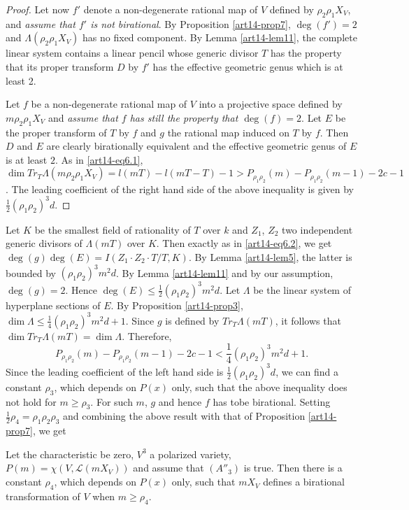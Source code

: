 \begin{proof}
Let now $f'$ denote a non-degenerate rational map of $V$ defined by $\rho_{2}\rho_{1}X_{V}$, and {\em assume that $f'$ is not birational}. By Proposition \ref{art14-prop7}, $\deg(f')=2$ and $\Lambda(\rho_{2}\rho_{1}X_{V})$ has no fixed component. By Lemma \ref{art14-lem11}, the complete linear system contains a linear pencil whose generic divisor $T$ has the property that its proper transform $D$ by $f'$ has the effective geometric genus which is at least 2.

Let $f$ be a non-degenerate rational map of $V$ into a projective space defined by $m\rho_{2}\rho_{1}X_{V}$ and {\em assume that $f$ has still the property that $\deg(f)=2$}. Let $E$ be the proper transform of $T$ by $f$ and $g$ the rational map induced on $T$ by $f$. Then $D$ and $E$ are clearly birationally equivalent and the effective geometric genus of $E$ is at least $2$. As in \eqref{art14-eq6.1}, $\dim Tr_{T}\Lambda(m\rho_{2}\rho_{1}X_{V})=l(mT)-l(mT-T)-1>P_{\rho_{1}\rho_{2}}(m)-P_{\rho_{1}\rho_{2}}(m-1)-2c-1$. The leading coefficient of the right hand side of the above inequality is given by $\frac{1}{2}(\rho_{1}\rho_{2})^{3}d$.
\end{proof}

Let $K$ be the smallest field of rationality of $T$ over $k$ and $Z_{1}$, $Z_{2}$ two independent generic divisors of $\Lambda(mT)$ over $K$. Then exactly as in \eqref{art14-eq6.2}, we get $\deg(g)\deg(E)=I(Z_{1}\cdot Z_{2}\cdot T/T,K)$. By Lemma \ref{art14-lem5}, the latter is bounded by $(\rho_{1}\rho_{2})^{3}m^{2}d$. By Lemma \ref{art14-lem11} and by our assumption, $\deg(g)=2$. Hence $\deg(E)\leq \frac{1}{2}(\rho_{1}\rho_{2})^{3}m^{2}d$. Let $\Lambda$ be the linear system of hyperplane sections of $E$. By Proposition \ref{art14-prop3}, $\dim \Lambda\leq \frac{1}{4}(\rho_{1}\rho_{2})^{3}m^{2}d+1$. Since $g$ is defined by $Tr_{T}\Lambda (mT)$, it follows that $\dim Tr_{T}\Lambda(mT)=\dim \Lambda$. Therefore,
$$
P_{\rho_{1}\rho_{2}}(m)-P_{\rho_{1}\rho_{2}}(m-1)-2c-1<\frac{1}{4}(\rho_{1}\rho_{2})^{3}m^{2}d+1.
$$
Since the leading coefficient of the left hand side is $\frac{1}{2}(\rho_{1}\rho_{2})^{3}d$, we can find a constant $\rho_{3}$, which depends on $P(x)$ only, such that the above inequality does not hold for $m\geq \rho_{3}$. For such $m$, $g$ and hence $f$ has to\pageoriginale be birational. Setting $\frac{1}{2}\rho_{4}=\rho_{1}\rho_{2}\rho_{3}$ and combining the above result with that of Proposition \ref{art14-prop7}, we get

\begin{theorem}\label{art14-thm1}
Let the characteristic be zero, $V^{3}$ a polarized variety, $P(m)=\chi(V,\mathscr{L}(mX_{V}))$ and assume that $(A''_{3})$ is true. Then there is a constant $\rho_{4}$, which depends on $P(x)$ only, such that $mX_{V}$ defines a birational transformation of $V$ when $m\geq \rho_{4}$.
\end{theorem}

